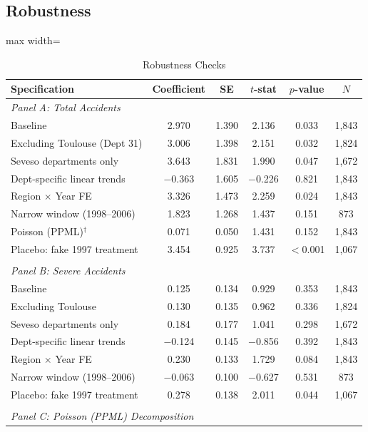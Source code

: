 \documentclass[12pt]{article}
\begin{document}
\subsection{Robustness}

\begin{table}[H]
\centering
\caption{Robustness Checks}
\label{tab:robustness}
\begin{adjustbox}{max width=\textwidth}
\begin{tabular}{lccccc}
\toprule
Specification & Coefficient & SE & $t$-stat & $p$-value & $N$ \\
\midrule
\multicolumn{6}{l}{\textit{Panel A: Total Accidents}} \\
Baseline & 2.970 & 1.390 & 2.136 & 0.033 & 1,843 \\
Excluding Toulouse (Dept 31) & 3.006 & 1.398 & 2.151 & 0.032 & 1,824 \\
Seveso departments only & 3.643 & 1.831 & 1.990 & 0.047 & 1,672 \\
Dept-specific linear trends & $-$0.363 & 1.605 & $-$0.226 & 0.821 & 1,843 \\
Region $\times$ Year FE & 3.326 & 1.473 & 2.259 & 0.024 & 1,843 \\
Narrow window (1998--2006) & 1.823 & 1.268 & 1.437 & 0.151 & 873 \\
Poisson (PPML)$^{\dagger}$ & 0.071 & 0.050 & 1.431 & 0.152 & 1,843 \\
Placebo: fake 1997 treatment & 3.454 & 0.925 & 3.737 & $<$0.001 & 1,067 \\
\\
\multicolumn{6}{l}{\textit{Panel B: Severe Accidents}} \\
Baseline & 0.125 & 0.134 & 0.929 & 0.353 & 1,843 \\
Excluding Toulouse & 0.130 & 0.135 & 0.962 & 0.336 & 1,824 \\
Seveso departments only & 0.184 & 0.177 & 1.041 & 0.298 & 1,672 \\
Dept-specific linear trends & $-$0.124 & 0.145 & $-$0.856 & 0.392 & 1,843 \\
Region $\times$ Year FE & 0.230 & 0.133 & 1.729 & 0.084 & 1,843 \\
Narrow window (1998--2006) & $-$0.063 & 0.100 & $-$0.627 & 0.531 & 873 \\
Placebo: fake 1997 treatment & 0.278 & 0.138 & 2.011 & 0.044 & 1,067 \\
\\
\multicolumn{6}{l}{\textit{Panel C: Poisson (PPML) Decomposition}} \\

\end{tabular}
\end{adjustbox}
\end{table}
\end{document}
